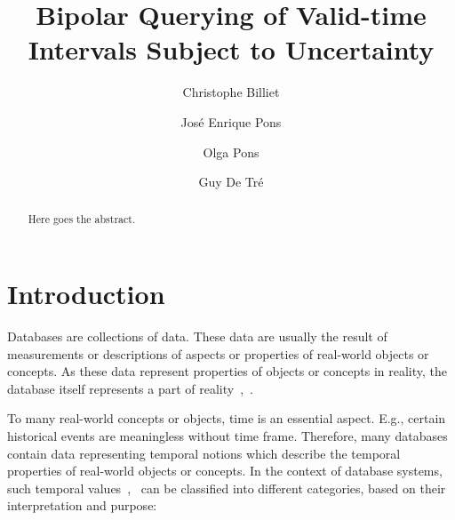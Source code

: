 \documentclass[runningheads,a4paper]{llncs}
\begin{document}
\mainmatter  %

\title{Bipolar Querying of Valid-time Intervals Subject to Uncertainty}


\author{Christophe Billiet \and Jos\'{e} Enrique Pons \and Olga Pons \and Guy De Tr\'{e}}



\maketitle


\begin{abstract}
Here goes the abstract.
\end{abstract}


\section{Introduction}
Databases are collections of data. These data are usually the result of measurements or descriptions of aspects or properties of real-world objects or concepts. As these data represent properties of objects or concepts in reality, the database itself represents a part of reality~\cite{Billiet2012ipmu},~\cite{Pons2012ipmu}.

To many real-world concepts or objects, time is an essential aspect. E.g., certain historical events are meaningless without time frame. Therefore, many databases contain data representing temporal notions which describe the temporal properties of real-world objects or concepts. In the context of database systems, such temporal values~\cite{Dyreson1994sigmod},~\cite{Bohlen1998lncs} can be classified into different categories, based on their interpretation and purpose:
\end{document}
